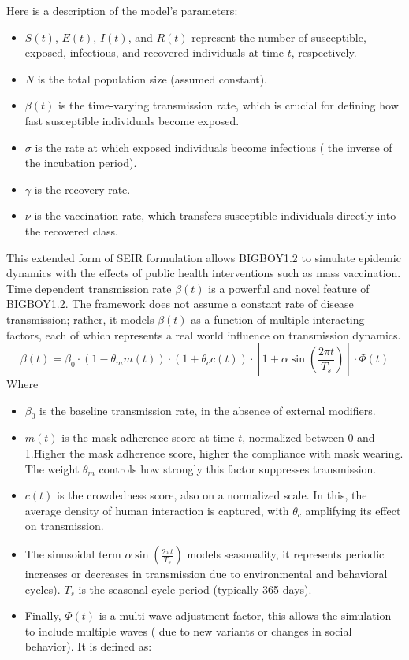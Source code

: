 \documentclass[11pt,a4paper]{article}
\theoremstyle{remark}\newtheorem{remark}{Remark}
\begin{document}
Here is a description of the model's parameters:
\begin{itemize}
    \item $S(t)$, $E(t)$, $I(t)$, and $R(t)$ represent the number of susceptible, exposed, infectious, and recovered individuals at time $t$, respectively.
    \item $N$ is the total population size (assumed constant).
    \item $\beta(t)$ is the time-varying transmission rate, which is crucial for defining how fast susceptible individuals become exposed.
    \item $\sigma$ is the rate at which exposed individuals become infectious ( the inverse of the incubation period).
    \item $\gamma$ is the recovery rate.
    \item $\nu$ is the vaccination rate, which transfers susceptible individuals directly into the recovered class.
\end{itemize}
This extended form of SEIR formulation allows BIGBOY1.2 to simulate epidemic dynamics with the effects of public health interventions such as mass vaccination. \\
Time dependent transmission rate $\beta(t)$ is a powerful and novel feature of BIGBOY1.2. The framework does not assume a constant rate of disease transmission; rather, it models $\beta(t)$ as a function of multiple interacting factors, each of which represents a real world influence on transmission dynamics. 
\begin{equation} \label{eq:beta_t_definition}
\beta(t) = \beta_0 \cdot (1 - \theta_m m(t)) \cdot (1 + \theta_c c(t)) \cdot \left[ 1 + \alpha \sin\left(\frac{2\pi t}{T_s}\right) \right] \cdot \Phi(t)
\end{equation}
Where 
\begin{itemize}
    \item $\beta_0$ is the baseline transmission rate, in the absence of external modifiers.
    \item $m(t)$ is the mask adherence score at time $t$, normalized between 0 and 1.Higher the mask adherence score, higher the compliance with mask wearing. The weight $\theta_m$ controls how strongly this factor suppresses transmission.
    \item $c(t)$ is the crowdedness score, also on a normalized scale. In this, the average density of human interaction is captured, with $\theta_c$ amplifying its effect on transmission.
    \item The sinusoidal term $\alpha \sin\left( \frac{2 \pi t}{T_s} \right)$ models seasonality, it represents periodic increases or decreases in transmission due to environmental and behavioral cycles). $T_s$ is the seasonal cycle period (typically 365 days).
    \item Finally, $\Phi(t)$ is a multi-wave adjustment factor, this allows the simulation to include multiple waves ( due to new variants or changes in social behavior). It is defined as:
\end{itemize}
\end{document}
